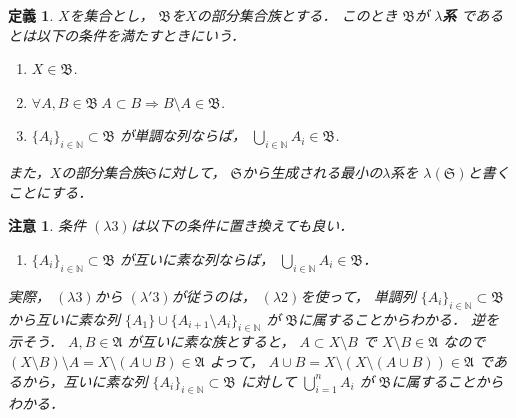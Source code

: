 \documentclass[leqno, a4paper, 12pt]{jsarticle}
\newtheorem{df}[thm]{定義}
\newtheorem*{rmk}{注意}
\newcommand{\To}{\Longrightarrow}
\newcommand{\nn}{\mathbb{N}}
\begin{document}
\begin{df}
$X$を集合とし，
$\mathfrak{B}$を$X$の部分集合族とする．
このとき
$\mathfrak{B}$が
\textbf{$\lambda$系}
であるとは以下の条件を満たすときにいう．
\begin{enumerate}
\item[\emph{($\lambda$1)}] $X\in \mathfrak{B}$. 
\item[\emph{($\lambda$2)}] $\forall A, B\in \mathfrak{B}\ 
A\subset B\To B\setminus A\in \mathfrak{B}$. 
\item[\emph{($\lambda$3)}] 
$\{A_{i}\}_{i\in \nn}\subset \mathfrak{B}$
が単調な列ならば，
$\bigcup_{i\in \nn}A_{i}\in \mathfrak{B}$. 
\end{enumerate}
また，$X$の部分集合族$\mathfrak{S}$に対して，
$\mathfrak{S}$から生成される最小の$\lambda$系を
$\lambda(\mathfrak{S})$と書くことにする．

\end{df}
\begin{rmk}
条件
$(\lambda 3)$は以下の条件に置き換えても良い．
\begin{enumerate}
\item[\emph{($\lambda'$3)}] 
$\{A_{i}\}_{i\in \nn}\subset \mathfrak{B}$
が互いに素な列ならば，
$\bigcup_{i\in \nn}A_i
\in \mathfrak{B}$．
\end{enumerate}
実際，
$(\lambda 3)$から
$(\lambda'3)$が従うのは，
$(\lambda2)$を使って，
単調列
$\{A_{i}\}_{i\in \nn}\subset \mathfrak{B}$
から互いに素な列
$\{A_{1}\}\cup \{A_{i+1}\setminus A_{i}\}_{i\in \nn}$
が
$\mathfrak{B}$に属することからわかる．
逆を示そう．
$A, B\in \mathfrak{A}$
が互いに素な族とすると，
$A\subset X\setminus B$
で 
$X\setminus B\in \mathfrak{A}$
なので
$(X\setminus B)\setminus A=X\setminus (A\cup B)\in \mathfrak{A}$
よって，
$A\cup B=X\setminus (X\setminus (A\cup B))\in \mathfrak{A}$
であるから，互いに素な列
$\{A_{i}\}_{i\in \nn}\subset \mathfrak{B}$
に対して
$\bigcup_{i=1}^{n}A_{i}$
が
$\mathfrak{B}$に属することから
わかる．

\end{rmk}
\end{document}
